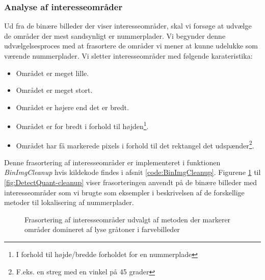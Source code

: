 \subsubsection{Analyse af interesseområder}
\label{sec:BinImgCleanup}
Ud fra de binære billeder der viser interesseområder, skal vi forsøge at udvælge de områder der mest sandsynligt er nummerplader. Vi begynder denne udvælgelsesproces med at frasortere de områder vi mener at kunne udelukke som værende nummerplader. Vi sletter interesseområder med følgende karateristika:
\begin{itemize}
\item Området er meget lille.
\item Området er meget stort.
\item Området er højere end det er bredt.
\item Området er for bredt i forhold til højden\footnote{I forhold til højde/bredde forholdet for en nummerplade}.
\item Området har få markerede pixels i forhold til det rektangel det udspænder\footnote{F.eks. en streg med en vinkel på 45 grader}.
\end{itemize}

Denne frasortering af interesseområder er implementeret i funktionen \textit{BinImgCleanup} hvis kildekode findes i afsnit \ref{code:BinImgCleanup}. Figurene \ref{fig:DetectSameness-cleanup} til \ref{fig:DetectQuant-cleanup} viser frasorteringen anvendt på de binære billeder med interesseområder som vi brugte som eksempler i beskrivelsen af de forskellige metoder til lokalisering af nummerplader. 

\begin{figure}[htbp]
  \centering
  \begin{minipage}[b]{5 cm}
  \end{minipage}
  \begin{minipage}[b]{5 cm}
  \end{minipage}
  \caption{Frasortering af interesseområder udvalgt af metoden der markerer områder domineret af lyse gråtoner i farvebilleder}
  \label{fig:DetectSameness-cleanup}
\end{figure}

